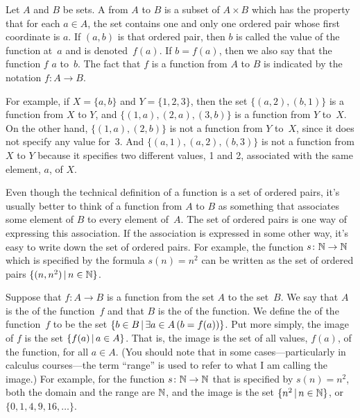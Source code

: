\begin{definition}
Let $A$ and $B$ be sets.  A  from $A$ to
$B$ is a subset of $A\times B$ which has the property that
for each $a\in A$, the set contains one and only one ordered
pair whose first coordinate is $a$.  If $(a,b)$ is that
ordered pair, then $b$ is called the value of the function at~$a$
and is denoted~$f(a)$.  If $b=f(a)$, then we also say that the
function $f$  $a$ to~$b$.
The fact that $f$ is a function from
$A$ to $B$ is indicated by the notation $f\colon A\to B$.
\end{definition}

For example, if $X=\{a,b\}$ and $Y=\{1,2,3\}$, then the
set $\{(a,2), (b,1)\}$ is a function from $X$ to $Y$,
and $\{(1,a), (2,a), (3,b)\}$ is a function from $Y$ to~$X$.
On the other hand, $\{(1,a),(2,b)\}$ is not a function from
$Y$ to~$X$, since it does not specify any value for~3.
And $\{(a,1),(a,2),(b,3)\}$ is not a function from $X$ to
$Y$ because it specifies two different values, 1 and 2, 
associated with the same element, $a$, of $X$.

Even though the technical definition of a function is a set
of ordered pairs, it's usually better to think of a function
from $A$ to $B$ as something that associates some element of
$B$ to every element of~$A$.  The set of ordered pairs is one
way of expressing this association.  If the association is
expressed in some other way, it's easy to write down the
set of ordered pairs.  For example, the function
$s\colon{\mathbb N}\to{\mathbb N}$ which is specified by the formula
$s(n)=n^2$ can be written as the set of ordered
pairs $\{(n,n^2)\,|\, n\in {\mathbb N}\}$.

\medbreak

Suppose that $f\colon A\to B$ is a function from the set
$A$ to the set~$B$.  We say that $A$ is the  of
the function~$f$ and that $B$ is the  of the function.
We define the  of the function~$f$ to be the
set $\{b\in B\,|\, \exists a\in A\,(b=f(a))\}$.  Put
more simply, the image of $f$ is the set $\{f(a)\,|\, a\in A\}$.
That is, the image is the set of all values, $f(a)$, of the
function, for all $a\in A$.  (You should note that in some
cases---particularly in calculus courses---the term ``range''
is used to refer to what I am calling the image.)
For example, for the function $s\colon{\mathbb N}\to{\mathbb N}$ that is specified
by $s(n)=n^2$, both the domain and the range are ${\mathbb N}$, and
the image is the set $\{n^2\,|\, n\in{\mathbb N}\}$, or $\{0,1,4,9,16,\dots\}$.

